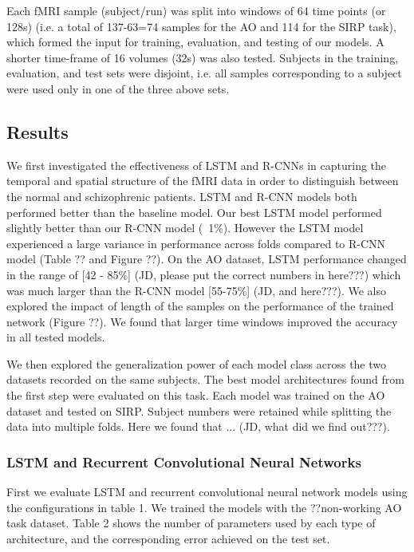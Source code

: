 \documentclass{article} %
\begin{document}
Each fMRI sample (subject/run) was split into windows of 64 time points (or 128s) (i.e. a total of 137-63=74 samples for the AO and 114 for the SIRP task), which formed the input for training, evaluation, and testing of our models. A shorter time-frame of 16 volumes (32s) was also tested. Subjects in the training, evaluation, and test sets were disjoint, i.e. all samples corresponding to a subject were used only in one of the three above sets.

\subsection*{Results}

We first investigated the effectiveness of LSTM and R-CNNs in capturing the temporal and spatial structure of the fMRI data in order to distinguish between the normal and schizophrenic patients. LSTM and R-CNN models both performed better than the baseline model. Our best LSTM model performed slightly better than our R-CNN model (~1\%). However the LSTM model experienced a large variance in performance across folds compared to R-CNN model (Table ?? and Figure ??). On the AO dataset, LSTM performance changed in the range of [42 - 85\%] (JD, please put the correct numbers in here???) which was much larger than the R-CNN model [55-75\%] (JD, and here???).
We also explored the impact of length of the samples on the performance of the trained network (Figure ??). We found that larger time windows improved the accuracy in all tested models.

We then explored the generalization power of each model class across the two datasets recorded on the same subjects. The best model architectures found from the first step were evaluated on this task. Each model was trained on the AO dataset and tested on SIRP. Subject numbers were retained while splitting the data into multiple folds. Here we found that ... (JD, what did we find out???).



\subsubsection*{LSTM and Recurrent Convolutional Neural Networks}

First we evaluate LSTM and recurrent convolutional neural network models using the configurations in table 1. We trained the models with the ??non-working AO task dataset. Table 2 shows the number of parameters used by each type of architecture, and the corresponding error achieved on the test set.
\end{document}
